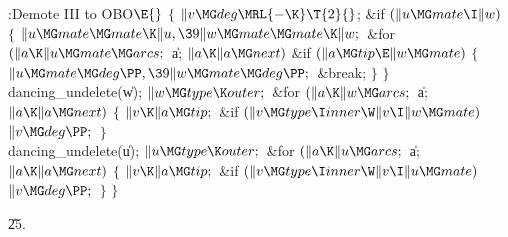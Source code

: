 \B{}:Demote III to OBO\X${}\E{}$\6
${}\{{}$\1\6
${}\|v\MG\\{deg}\MRL{-{\K}}\T{2}{}$;\6
\&{if} ${}(\|u\MG\\{mate}\I\|w){}$\5
${}\{{}$\1\6
${}\|u\MG\\{mate}\MG\\{mate}\K\|u,\39\|w\MG\\{mate}\MG\\{mate}\K\|w;{}$\6
\&{for} ${}(\|a\K\|u\MG\\{mate}\MG\\{arcs};{}$ \|a; ${}\|a\K\|a\MG\\{next}){}$%
\1\6
\&{if} ${}(\|a\MG\\{tip}\E\|w\MG\\{mate}){}$\5
${}\{{}$\1\6
${}\|u\MG\\{mate}\MG\\{deg}\PP,\39\|w\MG\\{mate}\MG\\{deg}\PP;{}$\6
\&{break};\6
\4${}\}{}$\2\2\6
\4${}\}{}$\2\6
\\{dancing\_undelete}(\|w);\6
${}\|w\MG\\{type}\K\\{outer};{}$\6
\&{for} ${}(\|a\K\|w\MG\\{arcs};{}$ \|a; ${}\|a\K\|a\MG\\{next}){}$\5
${}\{{}$\1\6
${}\|v\K\|a\MG\\{tip};{}$\6
\&{if} ${}(\|v\MG\\{type}\I\\{inner}\W\|v\I\|w\MG\\{mate}){}$\1\5
${}\|v\MG\\{deg}\PP;{}$\2\6
\4${}\}{}$\2\6
\\{dancing\_undelete}(\|u);\6
${}\|u\MG\\{type}\K\\{outer};{}$\6
\&{for} ${}(\|a\K\|u\MG\\{arcs};{}$ \|a; ${}\|a\K\|a\MG\\{next}){}$\5
${}\{{}$\1\6
${}\|v\K\|a\MG\\{tip};{}$\6
\&{if} ${}(\|v\MG\\{type}\I\\{inner}\W\|v\I\|u\MG\\{mate}){}$\1\5
${}\|v\MG\\{deg}\PP;{}$\2\6
\4${}\}{}$\2\6
\4${}\}{}$\2\par
\U25.\fi

